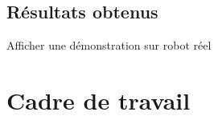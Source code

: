 \documentclass[11pt,french]{report}
\begin{document}
\section{Résultats obtenus}

Afficher une démonstration sur robot réel

\chapter{Cadre de travail}






\end{document}
